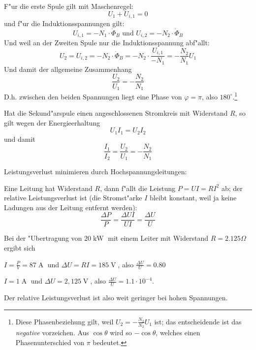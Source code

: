 F"ur die erste Spule gilt mit Maschenregel:
\begin{equation}
   \label{eq:360}
   U_1 + U_{i,1} = 0
\end{equation}
und f"ur die Induktionsspannungen gilt:
\begin{equation}
   \label{eq:365}
   U_{i,1} = -N_1 \cdot \dot \Phi_B \text{ und } U_{i,2} = -N_2 \cdot
   \dot \Phi_B
\end{equation}
Und weil an der Zweiten Spule nur die Induktionsspannung abf"allt:
\begin{equation*}
   \label{eq:366}
   U_2 = U_{i,2} = -N_2 \cdot \dot \Phi_B = -N_2 \cdot
   \frac{U_{i,1}}{-N_1} = - \frac{N_2}{N_1} U_1
\end{equation*}
Und damit der allgemeine Zusammenhang
\begin{equation*}
   \label{eq:367}
   {\frac{U_2}{U_1} = - \frac{N_2}{N_1}}
\end{equation*}
D.h. zwischen den beiden Spannungen liegt eine Phase von $\varphi =
\pi$, also $180^\circ$.\footnote{Diese Phasenbeziehung gilt, weil $U_2
= - \frac{N_2}{N_2}U_1$ ist; das entscheidende ist das \emph{negative}
vorzeichen. Aus $\cos\theta$ wird so $-\cos\theta$, welches einen
Phasenunterschied von $\pi$ bedeutet.}

Hat die Sekund"arspule einen angeschlossenen Stromkreis mit Widerstand
$R$, so gilt wegen der Energieerhaltung
\begin{equation*}
   U_1 I_1 = U_2 I_2
\end{equation*}
und damit
\begin{equation}
   \label{eq:368}
   \boxed{ \frac{I_1}{I_2} = \frac{U_2}{U_1} = - \frac{N_2}{N_1}}
\end{equation}




\begin{Beispiel}
   Leistungsverlust minimieren durch Hochspannungsleitungen:

   Eine Leitung hat Widerstand $R$, dann f"allt die Leistung $P = UI =
   RI^2$ ab; der relative Leistungsverlust ist (die Stromst"arke $I$
   bleibt konstant, weil ja keine Ladungen aus der Leitung entfernt werden):
\begin{equation*}
   \frac{\Delta P}{P} = \frac{\Delta UI}{UI} = \frac{\Delta U}{U}
\end{equation*}

Bei der "Ubertragung von $20\operatorname{kW}$ mit einem Leiter mit
Widerstand $R = 2.125\Omega$ ergibt sich
\begin{description}[\setlabelstyle{\bfseries\slshape}]
\item[Bei 230V] $I =\frac{P}{V}= 87\operatorname{A}$ und $\Delta U = RI =
   185\operatorname{V}$, also $\frac{\Delta U}{U} = 0.80$
\item[Bei 20 kV] $I = 1\operatorname{A}$ und $\Delta U = 2,125
   \operatorname{V}$, also $\frac{\Delta U}{U} = 1.1 \cdot 10^{-4}$.
\end{description}
Der relative Leistungsverlust ist also weit geringer bei hohen Spannungen.
\end{Beispiel}







